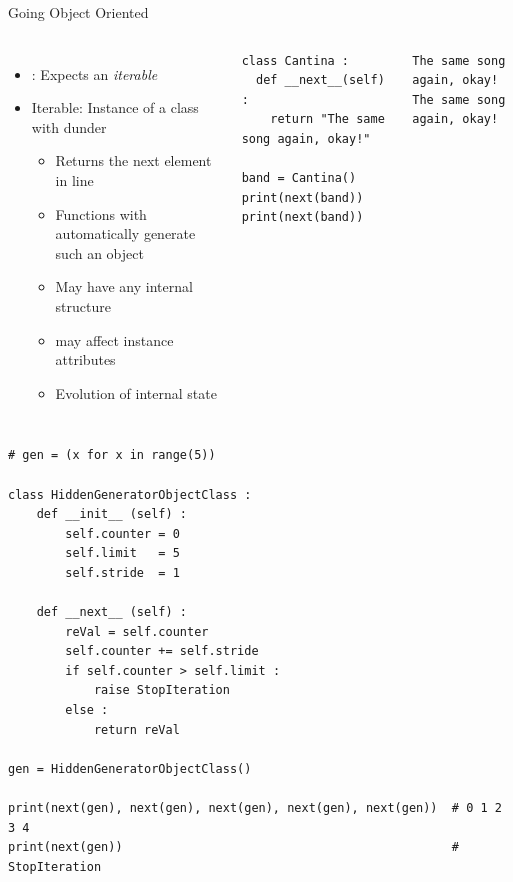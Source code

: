 \begin{frame}[fragile]{Going Object Oriented}
%
\begin{columns}[T]
\begin{itemize}
\item {}: Expects an \emph{iterable}
\item Iterable: Instance of a class with dunder 
	\begin{itemize}
	\item Returns the next element in line
	\item Functions with  automatically generate such an object
	\item May have any internal structure
	\item {} may affect instance attributes
	\item[\Thus] Evolution of internal state
	\end{itemize}
\end{itemize}
%
\begin{codebox}
\begin{verbatim}
class Cantina :
  def __next__(self) :
    return "The same song again, okay!"
    
band = Cantina()
print(next(band))
print(next(band))

\end{verbatim}
\end{codebox}
%
\begin{cmdbox}
\begin{verbatim}
The same song again, okay!
The same song again, okay!
\end{verbatim}
\end{cmdbox}
\end{columns}
%
\end{frame}


\begin{frame}[fragile]
%
\begin{codebox}
\begin{verbatim}
# gen = (x for x in range(5))

class HiddenGeneratorObjectClass :
    def __init__ (self) :
        self.counter = 0
        self.limit   = 5
        self.stride  = 1
    
    def __next__ (self) :
        reVal = self.counter
        self.counter += self.stride
        if self.counter > self.limit :
            raise StopIteration
        else :
            return reVal

gen = HiddenGeneratorObjectClass()

print(next(gen), next(gen), next(gen), next(gen), next(gen))  # 0 1 2 3 4
print(next(gen))                                              # StopIteration
\end{verbatim}
\end{codebox}
%
\end{frame}

